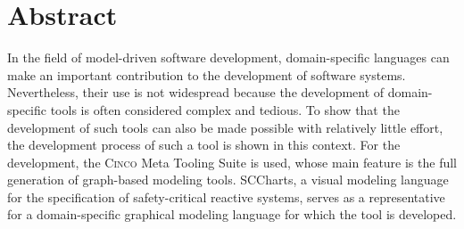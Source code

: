 \chapter*{Abstract}
In the field of model-driven software development, domain-specific languages can make an important contribution to the development of software systems. Nevertheless, their use is not widespread because the development of domain-specific tools is often considered complex and tedious. To show that the development of such tools can also be made possible with relatively little effort, the development process of such a tool is shown in this context. For the development, the \textsc{Cinco} Meta Tooling Suite is used, whose main feature is the full generation of graph-based modeling tools. SCCharts, a visual modeling language for the specification of safety-critical reactive systems, serves as a representative for a domain-specific graphical modeling language for which the tool is developed.

